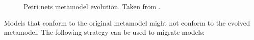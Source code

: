 \begin{figure}[tbp]
	\centering
	\caption[Petri nets metamodel evolution]{Petri nets metamodel evolution. Taken from \cite{rose10flock}.}
\label{fig:petri_nets_mms}
\end{figure}

Models that conform to the original metamodel might not conform to the evolved metamodel. The following strategy can be used to migrate models:

